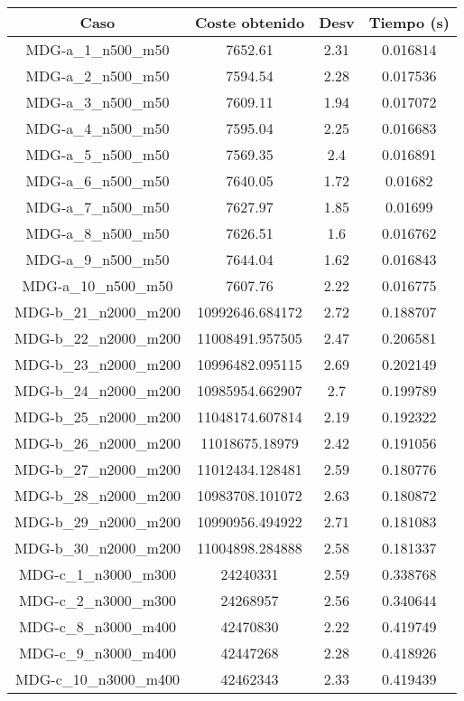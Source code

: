 \documentclass{article}
\begin{document}
\begin{table}[H]
	\centering
	\begin{tabular}{|cccc|}
		\hline
		Caso & Coste obtenido & Desv & Tiempo (s)\\ \hline
		MDG-a\_1\_n500\_m50 & 7652.61 & 2.31 & 0.016814\\
		MDG-a\_2\_n500\_m50 & 7594.54 & 2.28 & 0.017536\\
		MDG-a\_3\_n500\_m50 & 7609.11 & 1.94 & 0.017072\\
		MDG-a\_4\_n500\_m50 & 7595.04 & 2.25 & 0.016683\\
		MDG-a\_5\_n500\_m50 & 7569.35 & 2.4 & 0.016891\\
		MDG-a\_6\_n500\_m50 & 7640.05 & 1.72 & 0.01682\\
		MDG-a\_7\_n500\_m50 & 7627.97 & 1.85 & 0.01699\\
		MDG-a\_8\_n500\_m50 & 7626.51 & 1.6 & 0.016762\\
		MDG-a\_9\_n500\_m50 & 7644.04 & 1.62 & 0.016843\\
		MDG-a\_10\_n500\_m50 & 7607.76 & 2.22 & 0.016775\\
		MDG-b\_21\_n2000\_m200 & 10992646.684172 & 2.72 & 0.188707\\
		MDG-b\_22\_n2000\_m200 & 11008491.957505 & 2.47 & 0.206581\\
		MDG-b\_23\_n2000\_m200 & 10996482.095115 & 2.69 & 0.202149\\
		MDG-b\_24\_n2000\_m200 & 10985954.662907 & 2.7 & 0.199789\\
		MDG-b\_25\_n2000\_m200 & 11048174.607814 & 2.19 & 0.192322\\
		MDG-b\_26\_n2000\_m200 & 11018675.18979 & 2.42 & 0.191056\\
		MDG-b\_27\_n2000\_m200 & 11012434.128481 & 2.59 & 0.180776\\
		MDG-b\_28\_n2000\_m200 & 10983708.101072 & 2.63 & 0.180872\\
		MDG-b\_29\_n2000\_m200 & 10990956.494922 & 2.71 & 0.181083\\
		MDG-b\_30\_n2000\_m200 & 11004898.284888 & 2.58 & 0.181337\\
		MDG-c\_1\_n3000\_m300 & 24240331 & 2.59 & 0.338768\\
		MDG-c\_2\_n3000\_m300 & 24268957 & 2.56 & 0.340644\\
		MDG-c\_8\_n3000\_m400 & 42470830 & 2.22 & 0.419749\\
		MDG-c\_9\_n3000\_m400 & 42447268 & 2.28 & 0.418926\\
		MDG-c\_10\_n3000\_m400 & 42462343 & 2.33 & 0.419439\\

\end{tabular}
\end{table}
\end{document}
